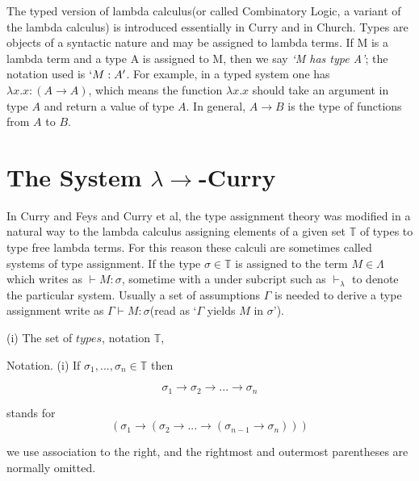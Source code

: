 The typed version of lambda calculus(or called Combinatory Logic, a variant of the lambda calculus) is introduced essentially in Curry\cite{curry1934functionality} and in Church\cite{church1940formulation}. Types are objects of a syntactic nature and may be assigned to lambda terms. If M is a lambda term and a type A is assigned to M, then we say \textit{`M has type A'}; the notation used is $`M:A'$. For example, in a typed system one has $\lambda x.x : (A \rightarrow A)$, which means the function $\lambda x.x$ should take an argument in type $A$ and return a value of type $A$. In general, $A \rightarrow B$ is the type of functions from $A$ to $B$.

\section{The System $\lambda \rightarrow $-Curry}

In Curry and Feys\cite{curry1972combinatory} and Curry et al\cite{curry1972combinatory2}, the type assignment theory was modified in a natural way to the lambda calculus assigning elements of a given set $\mathbb{T}$ of types to type free lambda terms. For this reason these calculi are sometimes called systems of type assignment. If the type $\sigma \in \mathbb{T}$ is assigned to the term $M \in \Lambda$ which writes as $\vdash M : \sigma$, sometime with a under subcript such as $\vdash _\lambda$ to denote the particular system. Usually a set of assumptions $\Gamma$ is needed to derive a type assignment write as $\Gamma \vdash M : \sigma$(read as `$\Gamma$ yields $M$ in $\sigma$').

\begin{def1}
\normalfont (i) The set of $types$, notation $\mathbb{T}$, 
\end{def1} 

Notation. (i) If $\sigma _1,...,\sigma _n \in \mathbb{T}$ then

\begin{equation*}
\sigma _1 \rightarrow \sigma _2 \rightarrow ... \rightarrow \sigma _n
\end{equation*}

stands for
\begin{equation*}
(\sigma _1 \rightarrow (\sigma _2 \rightarrow ... \rightarrow (\sigma _{n-1} \rightarrow \sigma _n)))
\end{equation*}

we use association to the right, and the rightmost and outermost parentheses are normally omitted. 

